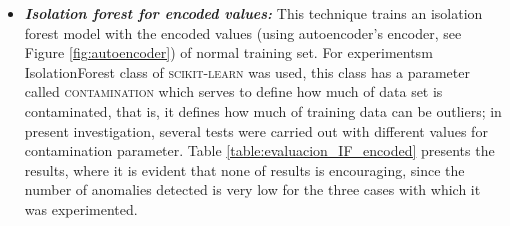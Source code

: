 \begin{itemize}
\item \textbf{\textit{Isolation forest for encoded values: }}This technique trains an isolation forest model with the encoded values (using autoencoder's encoder, see Figure \ref{fig:autoencoder}) of normal training set. For experimentsm IsolationForest class of \textsc{scikit-learn} was used, this class has a parameter called \textsc{contamination} which serves to define how much of data set is contaminated, that is, it defines how much of training data can be outliers; in present investigation, several tests were carried out with different values for contamination parameter. Table  \ref{table:evaluacion_IF_encoded} presents the results, where it is evident that none of results is encouraging, since the number of anomalies detected is very low for the three cases with which it was experimented.


\end{itemize}
